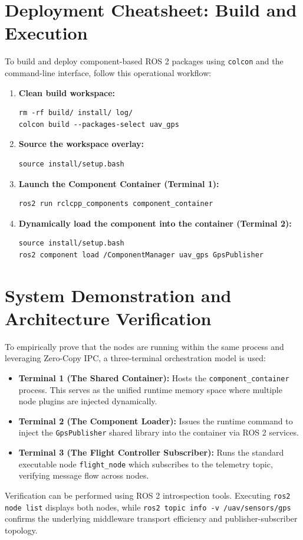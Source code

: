 \documentclass{article}
\begin{document}
\section{Deployment Cheatsheet: Build and Execution}
To build and deploy component-based ROS 2 packages using \texttt{colcon} and the command-line interface, follow this operational workflow:

\begin{enumerate}
\item \textbf{Clean build workspace:}
\begin{verbatim}
rm -rf build/ install/ log/
colcon build --packages-select uav_gps
\end{verbatim}
\item \textbf{Source the workspace overlay:}
\begin{verbatim}
source install/setup.bash
\end{verbatim}
\item \textbf{Launch the Component Container (Terminal 1):}
\begin{verbatim}
ros2 run rclcpp_components component_container
\end{verbatim}
\item \textbf{Dynamically load the component into the container (Terminal 2):}
\begin{verbatim}
source install/setup.bash
ros2 component load /ComponentManager uav_gps GpsPublisher
\end{verbatim}
\end{enumerate}

\section{System Demonstration and Architecture Verification}
To empirically prove that the nodes are running within the same process and leveraging Zero-Copy IPC, a three-terminal orchestration model is used:
\begin{itemize}
    \item \textbf{Terminal 1 (The Shared Container):} Hosts the \texttt{component\_container} process. This serves as the unified runtime memory space where multiple node plugins are injected dynamically.
    \item \textbf{Terminal 2 (The Component Loader):} Issues the runtime command to inject the \texttt{GpsPublisher} shared library into the container via ROS 2 services.
    \item \textbf{Terminal 3 (The Flight Controller Subscriber):} Runs the standard executable node \texttt{flight\_node} which subscribes to the telemetry topic, verifying message flow across nodes.
\end{itemize}

Verification can be performed using ROS 2 introspection tools. Executing \texttt{ros2 node list} displays both nodes, while \texttt{ros2 topic info -v /uav/sensors/gps} confirms the underlying middleware transport efficiency and publisher-subscriber topology.
\end{document}

